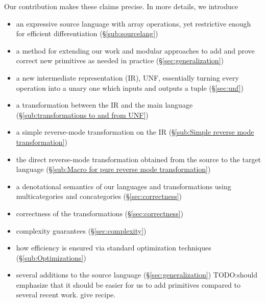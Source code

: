 Our contribution makes these claims precise. In more details, we introduce
\begin{itemize}
    \item an expressive source language with array operations, yet restrictive enough for efficient differentiation (\S\ref{sub:sourcelang})
    \item a method for extending our work and modular approaches to add and prove correct new primitives as needed in practice (\S\ref{sec:generalization})
    \item a new intermediate representation (IR), UNF, essentially turning every operation into a unary one which inputs and outputs a tuple (\S\ref{sec:unf})
    \item a transformation between the IR and the main language (\S\ref{sub:transformations to and from UNF})
    \item a simple reverse-mode transformation on the IR (\S\ref{sub:Simple reverse mode transformation})
    \item the direct reverse-mode transformation obtained from the source to the target language (\S\ref{sub:Macro for pure reverse mode transformation})
    \item a denotational semantics of our languages and transformations using multicategories and concategories (\S\ref{sec:correctness})
    \item correctness of the transformations (\S\ref{sec:correctness})
    \item complexity guarantees (\S\ref{sec:complexity})
    \item how efficiency is ensured via standard optimization techniques (\S\ref{sub:Optimizations})
    \item several additions to the source language (\S\ref{sec:generalization}) TODO:should emphasize that it should be easier for us to add primitives compared to several recent work. give recipe.
\end{itemize}

